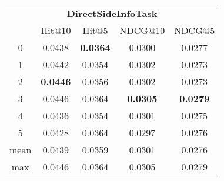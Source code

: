 \documentclass{article}
\begin{document}
 

\begin{tabular}{c|cccc}

\multicolumn{5}{c}{\textbf{DirectSideInfoTask}} \\
\noalign{\smallskip}
\noalign{\smallskip}
\toprule
\multicolumn{1}{c}{Template ID} & \multicolumn{1}{|c}{Hit@10} & \multicolumn{1}{c}{Hit@5} & \multicolumn{1}{c}{NDCG@10} & \multicolumn{1}{c}{NDCG@5} \\
\midrule
0 & 0.0438 & \textbf{0.0364} & 0.0300 & 0.0277 \\
1 & 0.0442 & 0.0354 & 0.0302 & 0.0273 \\
2 & \textbf{0.0446} & 0.0356 & 0.0302 & 0.0273 \\
3 & 0.0446 & 0.0364 & \textbf{0.0305} & \textbf{0.0279} \\
4 & 0.0436 & 0.0354 & 0.0301 & 0.0275 \\
5 & 0.0428 & 0.0364 & 0.0297 & 0.0276 \\
\midrule
mean & 0.0439 & 0.0359 & 0.0301 & 0.0276 \\
max & 0.0446 & 0.0364 & 0.0305 & 0.0279 \\
\bottomrule

\end{tabular}
\end{document}
